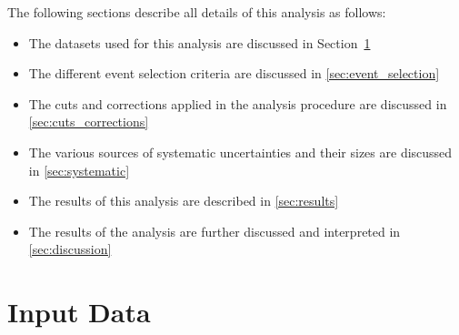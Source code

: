 The following sections describe all details of this analysis as follows:

\begin{itemize}
\item The datasets used for this analysis are discussed in Section~\ref{sec:used_data}
\item The different event selection criteria are discussed in \ref{sec:event_selection}
\item The cuts and corrections applied in the analysis procedure are discussed in  \ref{sec:cuts_corrections}
\item The various sources of systematic uncertainties and their sizes are discussed in \ref{sec:systematic}
\item The results of this analysis are described in \ref{sec:results}
\item The results of the analysis are further discussed and interpreted in \ref{sec:discussion}
\end{itemize}




%
%
\section{Input Data}
\label{sec:used_data}


